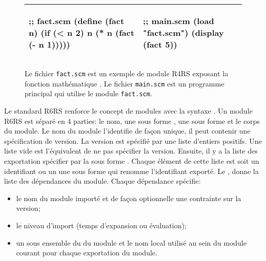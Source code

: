 \begin{figure}[ht]
  \begin{center}
    \begin{tabular}{|l|l|}
    \hline
    \begin{mplisting}{0.4}
;; fact.scm
(define (fact n)
  (if (< n 2)
    n
    (* n (fact (- n 1)))))
\end{mplisting} &
    \begin{mplisting}{0.4}
;; main.scm
(load "fact.scm")
(display (fact 5))
\end{mplisting} \\\hline
    \end{tabular}
  \end{center}

  \caption{Le fichier \texttt{fact.scm} est un exemple de module R4RS exposant
  la fonction mathématique . Le fichier \texttt{main.scm} est un
  programme principal qui utilise le module \texttt{fact.scm}.}
  \label{fig:r4rs_fact}
\end{figure}



Le standard R6RS\cite{Scheme:R6RS} renforce le concept de modules avec la
syntaxe .  Un module R6RS est séparé en 4 parties: le nom, une
sous forme , une sous forme  et le corps du
module. Le nom du module l'identifie de façon unique, il peut contenir une
spécification de version. La version est spécifié par une liste d'entiers
positifs. Une liste vide \lstcode{()} est l'équivalent de ne pas spécifier la
version. Ensuite, il y a la liste des exportation spécifier par la sous forme
. Chaque élément de cette liste est soit un identifiant ou un
une sous forme  qui renomme l'identifiant exporté. Le
, donne la liste des dépendances du module. Chaque dépendance
spécifie:

\begin{itemize}
  \item le nom du module importé et de façon optionnelle une contrainte sur
    la version;
  \item le niveau d'import (temps d'expansion ou évaluation);
  \item un sous ensemble du  du module et le nom local
    utilisé au sein du module courant pour chaque exportation du module.
\end{itemize}

